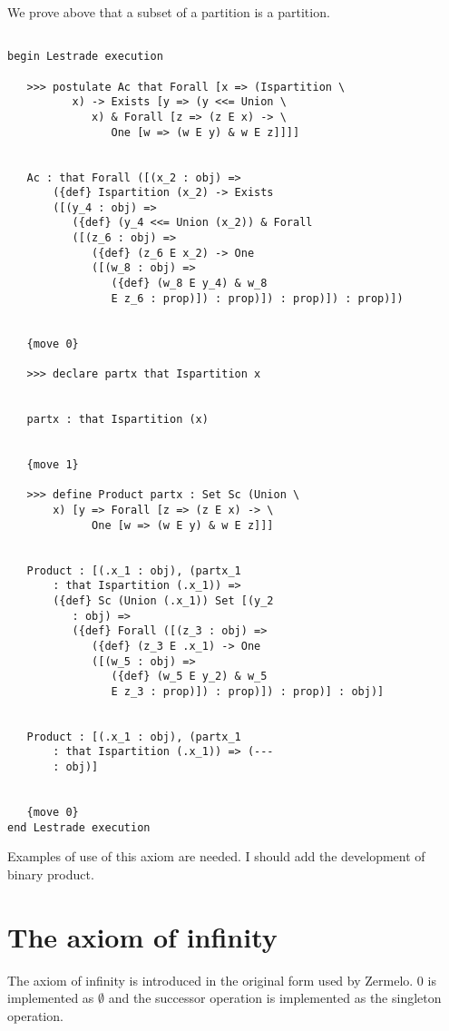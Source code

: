 \documentclass[12pt]{article}
\begin{document}
We prove above that a subset of a partition is a partition.

\begin{verbatim}

begin Lestrade execution

   >>> postulate Ac that Forall [x => (Ispartition \
          x) -> Exists [y => (y <<= Union \
             x) & Forall [z => (z E x) -> \
                One [w => (w E y) & w E z]]]]


   Ac : that Forall ([(x_2 : obj) => 
       ({def} Ispartition (x_2) -> Exists 
       ([(y_4 : obj) => 
          ({def} (y_4 <<= Union (x_2)) & Forall 
          ([(z_6 : obj) => 
             ({def} (z_6 E x_2) -> One 
             ([(w_8 : obj) => 
                ({def} (w_8 E y_4) & w_8 
                E z_6 : prop)]) : prop)]) : prop)]) : prop)])


   {move 0}

   >>> declare partx that Ispartition x


   partx : that Ispartition (x)


   {move 1}

   >>> define Product partx : Set Sc (Union \
       x) [y => Forall [z => (z E x) -> \
             One [w => (w E y) & w E z]]]


   Product : [(.x_1 : obj), (partx_1 
       : that Ispartition (.x_1)) => 
       ({def} Sc (Union (.x_1)) Set [(y_2 
          : obj) => 
          ({def} Forall ([(z_3 : obj) => 
             ({def} (z_3 E .x_1) -> One 
             ([(w_5 : obj) => 
                ({def} (w_5 E y_2) & w_5 
                E z_3 : prop)]) : prop)]) : prop)] : obj)]


   Product : [(.x_1 : obj), (partx_1 
       : that Ispartition (.x_1)) => (--- 
       : obj)]


   {move 0}
end Lestrade execution
\end{verbatim}

Examples of use of this axiom are needed.  I should add the development of binary product.


\section{The axiom of infinity}

The axiom of infinity is introduced in the original form used by Zermelo.  0 is implemented as $\emptyset$ and the successor operation is implemented as the singleton operation.
\end{document}
